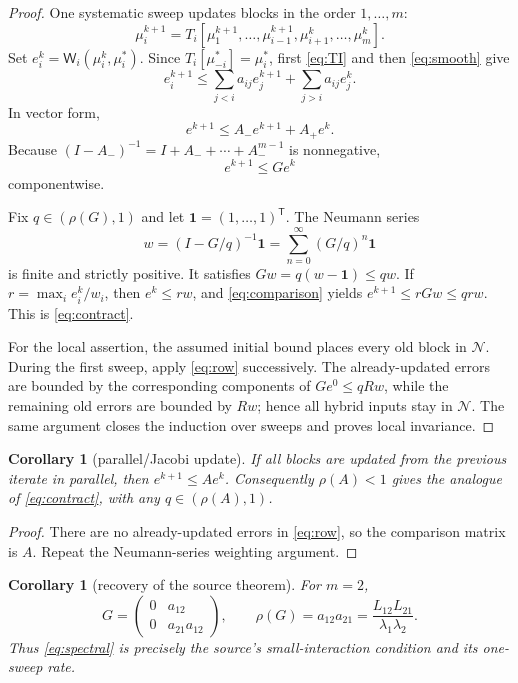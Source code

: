 \documentclass[11pt]{article}
\newtheorem{corollary}[theorem]{Corollary}
\newcommand{\W}{\mathsf W}
\newcommand{\rhoSp}{\rho}
\begin{document}
\begin{proof}
One systematic sweep updates blocks in the order $1,\ldots,m$:
\[
 \mu_i^{k+1}=T_i[\mu_1^{k+1},\ldots,\mu_{i-1}^{k+1},
                    \mu_{i+1}^{k},\ldots,\mu_m^k].
\]
Set $e_i^k=\W_i(\mu_i^k,\mu_i^*)$.  Since
$T_i[\mu_{-i}^*]=\mu_i^*$, first \eqref{eq:TI} and then
\eqref{eq:smooth} give
\begin{equation}\label{eq:row}
 e_i^{k+1}\le
 \sum_{j<i}a_{ij}e_j^{k+1}+\sum_{j>i}a_{ij}e_j^k.
\end{equation}
In vector form,
\[
 e^{k+1}\le A_-e^{k+1}+A_+e^k.
\]
Because $(I-A_-)^{-1}=I+A_-+\cdots+A_-^{m-1}$ is nonnegative,
\begin{equation}\label{eq:comparison}
 e^{k+1}\le Ge^k
\end{equation}
componentwise.

Fix $q\in(\rhoSp(G),1)$ and let $\mathbf1=(1,\ldots,1)^\mathsf T$.  The
Neumann series
\[
 w=(I-G/q)^{-1}\mathbf1
   =\sum_{n=0}^{\infty}(G/q)^n\mathbf1
\]
is finite and strictly positive.  It satisfies
$Gw=q(w-\mathbf1)\le qw$.  If
$r=\max_i e_i^k/w_i$, then $e^k\le rw$, and \eqref{eq:comparison} yields
$e^{k+1}\le rGw\le qrw$.  This is \eqref{eq:contract}.

For the local assertion, the assumed initial bound places every old block in
$\mathcal N$.  During the first sweep, apply \eqref{eq:row} successively.
The already-updated errors are bounded by the corresponding components of
$Ge^0\le qRw$, while the remaining old errors are bounded by $Rw$; hence all
hybrid inputs stay in $\mathcal N$.  The same argument closes the induction
over sweeps and proves local invariance.
\end{proof}

\begin{corollary}[parallel/Jacobi update]\label{cor:jacobi}
If all blocks are updated from the previous iterate in parallel, then
$e^{k+1}\le Ae^k$.  Consequently $\rhoSp(A)<1$ gives the analogue of
\eqref{eq:contract}, with any $q\in(\rhoSp(A),1)$.
\end{corollary}

\begin{proof}
There are no already-updated errors in \eqref{eq:row}, so the comparison
matrix is $A$.  Repeat the Neumann-series weighting argument.
\end{proof}

\begin{corollary}[recovery of the source theorem]
For $m=2$,
\[
 G=\begin{pmatrix}0&a_{12}\\0&a_{21}a_{12}\end{pmatrix},
 \qquad \rhoSp(G)=a_{12}a_{21}
 =\frac{L_{12}L_{21}}{\lambda_1\lambda_2}.
\]
Thus \eqref{eq:spectral} is precisely the source's small-interaction
condition and its one-sweep rate.
\end{corollary}
\end{document}
